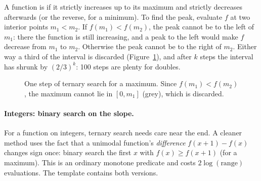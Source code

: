 A function is  if it strictly increases up to its maximum and strictly decreases afterwards (or the reverse,
for a minimum). To find the peak, evaluate $f$ at two interior points $m_1 < m_2$. If $f(m_1) < f(m_2)$, the peak cannot be to
the left of $m_1$: there the function is still increasing, and a peak to the left would make $f$ decrease from $m_1$ to
$m_2$. Otherwise the peak cannot be to the right of $m_2$. Either way a third of the interval is discarded
(Figure~\ref{fig:ternary}), and after $k$ steps the interval has shrunk by $(2/3)^k$: 100 steps are plenty for doubles.

\begin{figure}[htbp]
\centering
{}
\caption{One step of ternary search for a maximum. Since $f(m_1) < f(m_2)$, the maximum cannot lie in $[0, m_1]$ (grey),
which is discarded.}
\label{fig:ternary}
\end{figure}

\paragraph{Integers: binary search on the slope.} For a function on integers, ternary search needs care near the end. A
cleaner method uses the fact that a unimodal function's \emph{difference} $f(x+1) - f(x)$ changes sign once: binary search the
first $x$ with $f(x) \ge f(x + 1)$ (for a maximum). This is an ordinary monotone predicate and costs $2\log(\text{range})$
evaluations. The template contains both versions.

